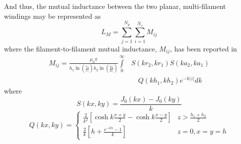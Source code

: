 \documentclass[conference]{IEEEtran}
\begin{document}
%
And thus, the mutual inductance between the two planar, multi-filament windings \cite{HurleyDuffy} may be represented as
%
\begin{equation}
	L_{M} = \sum\limits_{j=1}^{N_{p}}{\sum\limits_{i=1}^{N_{s}}{M_{ij}}}
\end{equation}
%
where the filament-to-filament mutual inductance, $ M_{ij} $, has been reported in \cite{HurleyDuffy}
\begin{equation}
\begin{split}
	M_{ij} = \frac{\mu_{0}\pi}{h_{1}\ln(\frac{r_{2}}{r_{1}})h_{2}\ln(\frac{a_{2}}{a_{1}})}\int\limits_{0}^{\infty} & S(kr_{2},kr_{1})S(ka_{2},ka_{1}) 
	\\ &\quad {Q(kh_{1},kh_{2})e^{-k|z|}dk}
\end{split}
\end{equation}
%
where
\begin{equation}
	S(kx, ky) = \frac{J_{0}(kx) - J_{0}(ky)}{k}
\end{equation}
%
\begin{equation}
	Q(kx, ky) = \left\{
		\begin{array}{lr}
		\frac{2}{k^{2}} \left[ \cosh{k\frac{x+y}{2}}-\cosh{k\frac{x-y}{2}} \right] & z>\frac{h_{1}+h_{2}}{2} \\
		\frac{2}{k} \left[ h+\frac{e^{-kh}-1}{k} \right] & z=0, x=y=h
		\end{array}
   \right.
\end{equation}
\end{document}
